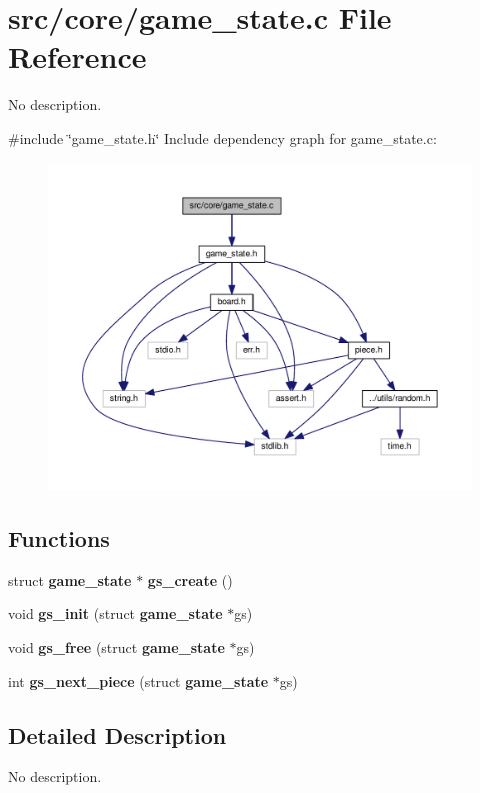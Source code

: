 \section{src/core/game\+\_\+state.c File Reference}
\label{game__state_8c}


No description.  


{\ttfamily \#include \char`\"{}game\+\_\+state.\+h\char`\"{}}\newline
Include dependency graph for game\+\_\+state.\+c\+:
\nopagebreak
\begin{figure}[H]
\begin{center}
\leavevmode
\includegraphics[width=350pt]{game__state_8c__incl}
\end{center}
\end{figure}
\subsection*{Functions}
\begin{DoxyCompactItemize}
\item 
struct \textbf{ game\+\_\+state} $\ast$ \textbf{ gs\+\_\+create} ()
\item 
void \textbf{ gs\+\_\+init} (struct \textbf{ game\+\_\+state} $\ast$gs)
\item 
void \textbf{ gs\+\_\+free} (struct \textbf{ game\+\_\+state} $\ast$gs)
\item 
int \textbf{ gs\+\_\+next\+\_\+piece} (struct \textbf{ game\+\_\+state} $\ast$gs)
\end{DoxyCompactItemize}


\subsection{Detailed Description}
No description. 

